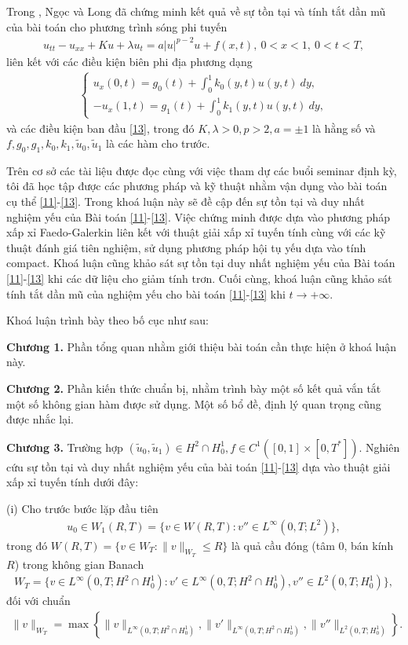 \documentclass[12pt,a4paper]{article}
\theoremstyle{definition}
\theoremstyle{definition}
\begin{document}
Trong \cite{5}, Ngọc và Long đã chứng minh kết quả về sự tồn tại và tính tắt dần mũ của bài toán cho phương trình sóng phi tuyến
\begin{align}
    u_{tt} - u_{xx} + Ku + \lambda u_t = a |u|^{p-2} u + f(x,t), \ 0 < x < 1,\ 0 < t < T,
\end{align}
liên kết với các điều kiện biên phi địa phương dạng
\begin{align}
\begin{cases}
    \displaystyle u_x(0,t) = g_0(t) + \int_0^1 k_0(y,t) u(y,t)\:dy, \\
    \displaystyle -u_x(1,t) = g_1(t) + \int_0^1 k_1(y,t) u(y,t)\:dy,
\end{cases}
\end{align}
và các điều kiện ban đầu \eqref{13}, trong đó $K, \lambda > 0, p > 2, a = \pm 1$ là hằng số và $f, g_0, g_1, k_0, k_1, \tilde{u}_0, \tilde{u}_1$ là các hàm cho trước.

Trên cơ sở các tài liệu được đọc cùng với việc tham dự các buổi seminar định kỳ, tôi đã học tập được các phương pháp và kỹ thuật nhằm vận dụng vào bài toán cụ thể \eqref{11}-\eqref{13}. Trong khoá luận này sẽ đề cập đến sự tồn tại và duy nhất nghiệm yếu của Bài toán \eqref{11}-\eqref{13}. Việc chứng minh được dựa vào phương pháp xấp xỉ Faedo-Galerkin liên kết với thuật giải xấp xỉ tuyến tính cùng với các kỹ thuật đánh giá tiên nghiệm, sử dụng phương pháp hội tụ yếu dựa vào tính compact. Khoá luận cũng khảo sát sự tồn tại duy nhất nghiệm yếu của Bài toán \eqref{11}-\eqref{13} khi các dữ liệu cho giảm tính trơn. Cuối cùng, khoá luận cũng khảo sát tính tắt dần mũ của nghiệm yếu cho bài toán \eqref{11}-\eqref{13} khi $t \to +\infty$.

Khoá luận trình bày theo bố cục như sau:

\textbf{Chương 1.} Phần tổng quan nhằm giới thiệu bài toán cần thực hiện ở khoá luận này.

\textbf{Chương 2.} Phần kiến thức chuẩn bị, nhằm trình bày một số kết quả vắn tắt một số không gian hàm được sử dụng. Một số bổ đề, định lý quan trọng cũng được nhắc lại.

\textbf{Chương 3.} Trường hợp $(\tilde{u}_0, \tilde{u}_1) \in H^2 \cap H^1_0, f \in C^1([0,1] \times [0,T^*])$. Nghiên cứu sự tồn tại và duy nhất nghiệm yếu của bài toán \eqref{11}-\eqref{13} dựa vào thuật giải xấp xỉ tuyến tính dưới đây:

(i) Cho trước bước lặp đầu tiên
\begin{align*}
    u_0 \in W_1(R,T) = \{ v \in W(R,T) \colon v'' \in L^\infty(0,T;L^2) \},
\end{align*}
trong đó $W(R,T) = \{ v \in W_T \colon \|v\|_{W_T} \le R \}$ là quả cầu đóng (tâm $0$, bán kính $R$) trong không gian Banach
\begin{align*}
   W_T = \{ v \in L^\infty(0,T;H^2 \cap H^1_0) \colon v' \in L^\infty(0,T;H^2 \cap H^1_0), v'' \in L^2(0,T;H^1_0) \},
\end{align*}
đối với chuẩn
\begin{align*}
    \|v\|_{W_T} = \max \left\{ \|v\|_{L^\infty(0,T;H^2 \cap H^1_0)}, \|v'\|_{L^\infty(0,T;H^2 \cap H^1_0)}, \|v''\|_{L^2(0,T;H^1_0)} \right\}.
\end{align*}
\end{document}
